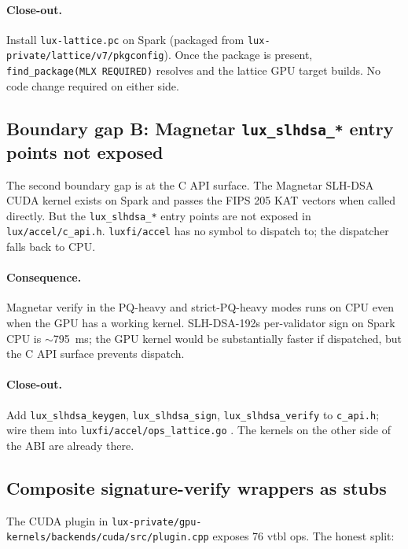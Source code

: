 \paragraph{Close-out.} Install \texttt{lux-lattice.pc} on Spark
(packaged from \texttt{lux-private/lattice/v7/pkgconfig}). Once
the package is present, \texttt{find\_package(MLX REQUIRED)}
resolves and the lattice GPU target builds. No code change
required on either side.

\subsection{Boundary gap B: Magnetar \texttt{lux\_slhdsa\_*}
entry points not exposed}

The second boundary gap is at the C API surface. The Magnetar
SLH-DSA \cite{lp181,fips205} CUDA kernel exists on Spark and
passes the FIPS 205 KAT vectors when called directly. But the
\texttt{lux\_slhdsa\_*} entry points are not exposed in
\texttt{lux/accel/c\_api.h}. \texttt{luxfi/accel} has no symbol
to dispatch to; the dispatcher falls back to CPU.

\paragraph{Consequence.} Magnetar verify in the PQ-heavy and
strict-PQ-heavy modes runs on CPU even when the GPU has a
working kernel. SLH-DSA-192s per-validator sign on Spark CPU is
$\sim$\SI{795}{\milli\second}; the GPU kernel would be
substantially faster if dispatched, but the C API surface
prevents dispatch.

\paragraph{Close-out.} Add \texttt{lux\_slhdsa\_keygen},
\texttt{lux\_slhdsa\_sign}, \texttt{lux\_slhdsa\_verify} to
\texttt{c\_api.h}; wire them into
\texttt{luxfi/accel/ops\_lattice.go} \cite{accelmod}. The kernels
on the other side of the ABI are already there.

\subsection{Composite signature-verify wrappers as stubs}

The CUDA plugin in
\texttt{lux-private/gpu-kernels/backends/cuda/src/plugin.cpp}
exposes 76 vtbl ops. The honest split:

